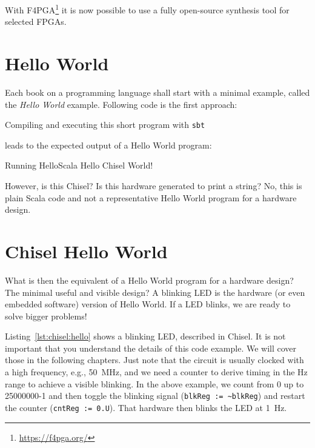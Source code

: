 \documentclass[%
    10pt,
    headinclude, footexclude,
    openright, %
    notitlepage,
    cleardoubleempty,
    headsepline,
    pointlessnumbers,
    bibtotoc, idxtotoc,
    ]{scrbook}
\newcommand{\code}[1]{{\small{\texttt{#1}}}}
\newcommand{\myref}[2]{\href{#1}{#2}}
\renewcommand{\myref}[2]{{#2}{\footnote{\url{#1}}}}
\begin{document}
With \myref{https://f4pga.org/}{F4PGA} it is now possible to use a fully open-source synthesis tool
for selected FPGAs.

\section{Hello World}

Each book on a programming language shall start with a minimal example,
called the \emph{Hello World} example. Following code is the first approach:




\noindent Compiling and executing this short program with \code{sbt}


\noindent leads to the expected output of a Hello World program:

\begin{chisel}
[info] Running HelloScala
Hello Chisel World!
\end{chisel}

\noindent However, is this Chisel? Is this hardware generated to print a string?
No, this is plain Scala code and not a representative Hello World
program for a hardware design.

\section{Chisel Hello World}

What is then the equivalent of a Hello World program for a hardware design?
The minimal useful and visible design? A blinking LED is the hardware (or even
embedded software) version of Hello World. If a LED blinks, we are ready to
solve bigger problems!


Listing~\ref{lst:chisel:hello} shows a blinking LED, described in Chisel.
It is not important that you understand the details of this code example.
We will cover those in the following chapters. Just note that the circuit is
usually clocked with a high frequency, e.g., 50~MHz, and we need a counter
to derive timing in the Hz range to achieve a visible blinking. In the above
example, we count from 0 up to 25000000-1 and then toggle the blinking signal
(\code{blkReg := \textasciitilde blkReg}) and restart the counter (\code{cntReg := 0.U}).
That hardware then blinks the LED at 1~Hz.
\end{document}
